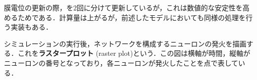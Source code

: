 膜電位の更新の際，を2回に分けて更新しているが，これは数値的な安定性を高めるためである．計算量は上がるが，前述したモデルにおいても同様の処理を行う実装もある．

シミュレーションの実行後，ネットワークを構成するニューロンの発火を描画する．これを\textbf{ラスタープロット} (raster plot)という．この図は横軸が時間，縦軸がニューロンの番号となっており，各ニューロンが発火したことを点で表している．
